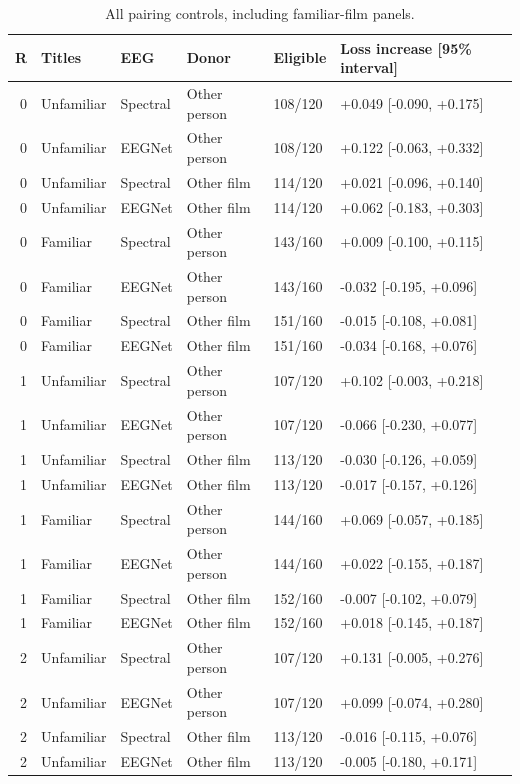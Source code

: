 \documentclass[10pt,a4paper]{article}
\begin{document}
\begin{table}[tbp]
\centering
\small
\caption{All pairing controls, including familiar-film panels.}
\label{tab:allpairing}
\begin{tabular}{rlllll}
\toprule
R & Titles & EEG & Donor & Eligible & Loss increase [95\% interval] \\
\midrule
0 & Unfamiliar & Spectral & Other person & 108/120 & +0.049 [-0.090, +0.175] \\
0 & Unfamiliar & EEGNet & Other person & 108/120 & +0.122 [-0.063, +0.332] \\
0 & Unfamiliar & Spectral & Other film & 114/120 & +0.021 [-0.096, +0.140] \\
0 & Unfamiliar & EEGNet & Other film & 114/120 & +0.062 [-0.183, +0.303] \\
0 & Familiar & Spectral & Other person & 143/160 & +0.009 [-0.100, +0.115] \\
0 & Familiar & EEGNet & Other person & 143/160 & -0.032 [-0.195, +0.096] \\
0 & Familiar & Spectral & Other film & 151/160 & -0.015 [-0.108, +0.081] \\
0 & Familiar & EEGNet & Other film & 151/160 & -0.034 [-0.168, +0.076] \\
1 & Unfamiliar & Spectral & Other person & 107/120 & +0.102 [-0.003, +0.218] \\
1 & Unfamiliar & EEGNet & Other person & 107/120 & -0.066 [-0.230, +0.077] \\
1 & Unfamiliar & Spectral & Other film & 113/120 & -0.030 [-0.126, +0.059] \\
1 & Unfamiliar & EEGNet & Other film & 113/120 & -0.017 [-0.157, +0.126] \\
1 & Familiar & Spectral & Other person & 144/160 & +0.069 [-0.057, +0.185] \\
1 & Familiar & EEGNet & Other person & 144/160 & +0.022 [-0.155, +0.187] \\
1 & Familiar & Spectral & Other film & 152/160 & -0.007 [-0.102, +0.079] \\
1 & Familiar & EEGNet & Other film & 152/160 & +0.018 [-0.145, +0.187] \\
2 & Unfamiliar & Spectral & Other person & 107/120 & +0.131 [-0.005, +0.276] \\
2 & Unfamiliar & EEGNet & Other person & 107/120 & +0.099 [-0.074, +0.280] \\
2 & Unfamiliar & Spectral & Other film & 113/120 & -0.016 [-0.115, +0.076] \\
2 & Unfamiliar & EEGNet & Other film & 113/120 & -0.005 [-0.180, +0.171] \\

\end{tabular}
\end{table}
\end{document}
